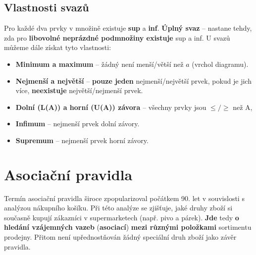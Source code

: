 \subsection{Vlastnosti svazů}
Pro každé dva prvky v množině existuje \textbf{sup} a \textbf{inf}. \textbf{Úplný svaz} -- nastane tehdy, zda pro \textbf{libovolné neprázdné podmnožiny existuje} sup a inf. U svazů můžeme dále získat tyto vlastnosti:
\begin{itemize}
    \item \textbf{Minimum a maximum} -- žádný není menší/větší než $a$ (vrchol diagramu).
    \item \textbf{Nejmenší a největší} -- \textbf{pouze jeden} nejmenší/největší prvek, pokud je jich více, \textbf{neexistuje} největší/nejmenší prvek.
    \item \textbf{Dolní (L(A)) a horní (U(A)) závora} -- všechny prvky jsou $\leq/\geq$ než A,
    \item \textbf{Infimum} -- nejmenší prvek dolní závory.
    \item \textbf{Supremum} -- nejmenší prvek horní závory.
\end{itemize}

\section{Asociační pravidla}
Termín asociační pravidla široce zpopularizoval počátkem 90. let v souvislosti s analýzou nákupního košíku. Při této analýze se zjišťuje, jaké druhy zboží si současně kupují zákazníci v supermarketech (např. pivo a párek). \textbf{Jde} tedy \textbf{o hledání vzájemných vazeb} (\textbf{asociací}) \textbf{mezi různými položkami} sortimentu prodejny. Přitom není upřednostňován žádný speciální druh zboží jako závěr pravidla.

